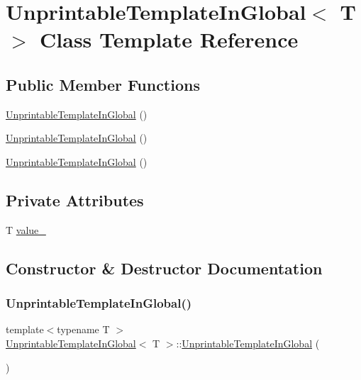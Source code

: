 \hypertarget{class_unprintable_template_in_global}{}\section{Unprintable\+Template\+In\+Global$<$ T $>$ Class Template Reference}
\label{class_unprintable_template_in_global}
\subsection*{Public Member Functions}
\begin{DoxyCompactItemize}
\item 
\mbox{\hyperlink{class_unprintable_template_in_global_a50fb82625ee9f5cceadf42f8b0f15bf7}{Unprintable\+Template\+In\+Global}} ()
\item 
\mbox{\hyperlink{class_unprintable_template_in_global_a50fb82625ee9f5cceadf42f8b0f15bf7}{Unprintable\+Template\+In\+Global}} ()
\item 
\mbox{\hyperlink{class_unprintable_template_in_global_a50fb82625ee9f5cceadf42f8b0f15bf7}{Unprintable\+Template\+In\+Global}} ()
\end{DoxyCompactItemize}
\subsection*{Private Attributes}
\begin{DoxyCompactItemize}
\item 
T \mbox{\hyperlink{class_unprintable_template_in_global_a5eb13fa2dc8de0e4ac8848f87df19283}{value\+\_\+}}
\end{DoxyCompactItemize}


\subsection{Constructor \& Destructor Documentation}
\mbox{\label{class_unprintable_template_in_global_a50fb82625ee9f5cceadf42f8b0f15bf7}} 
\subsubsection{\texorpdfstring{UnprintableTemplateInGlobal()}{UnprintableTemplateInGlobal()}\hspace{0.1cm}{\footnotesize\ttfamily [1/3]}}
{\footnotesize\ttfamily template$<$typename T $>$ \\
\mbox{\hyperlink{class_unprintable_template_in_global}{Unprintable\+Template\+In\+Global}}$<$ T $>$\+::\mbox{\hyperlink{class_unprintable_template_in_global}{Unprintable\+Template\+In\+Global}} (\begin{DoxyParamCaption}{ }\end{DoxyParamCaption})\hspace{0.3cm}{\ttfamily [inline]}}

